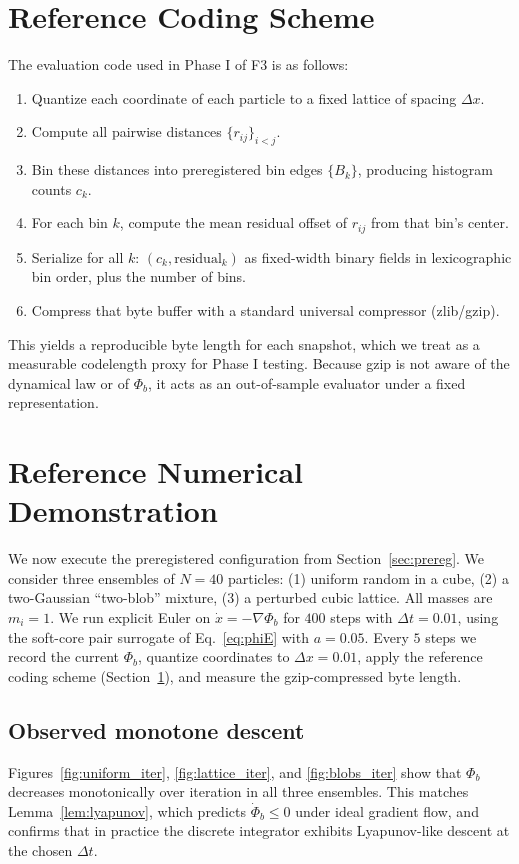 \documentclass[11pt]{article}
\begin{document}
\section{Reference Coding Scheme}
\label{sec:refcode}
The evaluation code used in Phase I of F3 is as follows:
\begin{enumerate}
    \item Quantize each coordinate of each particle to a fixed lattice of spacing $\Delta x$.
    \item Compute all pairwise distances $\{r_{ij}\}_{i<j}$.
    \item Bin these distances into preregistered bin edges $\{B_k\}$, producing histogram counts $c_k$.
    \item For each bin $k$, compute the mean residual offset of $r_{ij}$ from that bin's center.
    \item Serialize for all $k$: $(c_k, \text{residual}_k)$ as fixed-width binary fields in lexicographic bin order, plus the number of bins.
    \item Compress that byte buffer with a standard universal compressor (zlib/gzip).
\end{enumerate}
This yields a reproducible byte length for each snapshot, which we treat as a measurable codelength proxy for Phase I testing.
Because gzip is not aware of the dynamical law or of $\Phi_b$, it acts as an out-of-sample evaluator under a fixed representation.

\section{Reference Numerical Demonstration}
\label{sec:demo}
We now execute the preregistered configuration from Section~\ref{sec:prereg}.
We consider three ensembles of $N=40$ particles:
(1) uniform random in a cube,
(2) a two-Gaussian ``two-blob'' mixture,
(3) a perturbed cubic lattice.
All masses are $m_i{=}1$.
We run explicit Euler on $\dot{x}=-\nabla\Phi_b$ for $400$ steps with $\Delta t{=}0.01$, using the soft-core pair surrogate of Eq.~\eqref{eq:phiE} with $a{=}0.05$.
Every $5$ steps we record the current $\Phi_b$, quantize coordinates to $\Delta x{=}0.01$, apply the reference coding scheme (Section~\ref{sec:refcode}), and measure the gzip-compressed byte length.

\subsection*{Observed monotone descent}
Figures~\ref{fig:uniform_iter}, \ref{fig:lattice_iter}, and \ref{fig:blobs_iter} show that $\Phi_b$ decreases monotonically over iteration in all three ensembles.
This matches Lemma~\ref{lem:lyapunov}, which predicts $\dot{\Phi}_b\le 0$ under ideal gradient flow, and confirms that in practice the discrete integrator exhibits Lyapunov-like descent at the chosen $\Delta t$.
\end{document}
